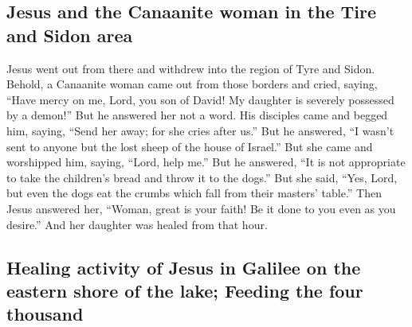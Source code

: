 \hypertarget{jesus-and-the-canaanite-woman-in-the-tire-and-sidon-area}{%
\subsection{Jesus and the Canaanite woman in the Tire and Sidon
area}\label{jesus-and-the-canaanite-woman-in-the-tire-and-sidon-area}}

 Jesus went out from there and withdrew into the region
of Tyre and Sidon.  Behold, a Canaanite woman came out
from those borders and cried, saying, ``Have mercy on me, Lord, you son
of David! My daughter is severely possessed by a demon!''
 But he answered her not a word. His disciples came and
begged him, saying, ``Send her away; for she cries after us.''
 But he answered, ``I wasn't sent to anyone but the lost
sheep of the house of Israel.''  But she came and
worshipped him, saying, ``Lord, help me.''  But he
answered, ``It is not appropriate to take the children's bread and throw
it to the dogs.''  But she said, ``Yes, Lord, but even
the dogs eat the crumbs which fall from their masters' table.''
 Then Jesus answered her, ``Woman, great is your faith!
Be it done to you even as you desire.'' And her daughter was healed from
that hour.

\hypertarget{healing-activity-of-jesus-in-galilee-on-the-eastern-shore-of-the-lake-feeding-the-four-thousand}{%
\subsection{Healing activity of Jesus in Galilee on the eastern shore of
the lake; Feeding the four
thousand}\label{healing-activity-of-jesus-in-galilee-on-the-eastern-shore-of-the-lake-feeding-the-four-thousand}}

